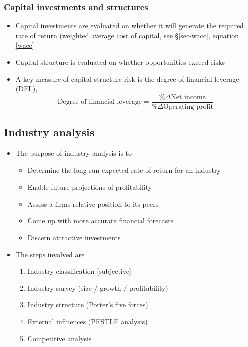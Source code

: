 \documentclass[../notes_compiled.tex]{subfiles}
\begin{document}
\subsubsection{Capital investments and structures}
\begin{itemize}
\item Capital investments are evaluated on whether it will generate the required rate of return (weighted average cost of capital, see \S\ref{sec-wacc}, equation \ref{wacc}
\item Capital structure is evaluated on whether opportunities exceed risks
\item A key measure of capital structure risk is the degree of financial leverage (DFL),
\begin{equation}
\text{Degree of financial leverage}  =\frac{\%\Delta\text{Net income}}{\%\Delta\text{Operating profit}}
\end{equation}
\end{itemize}

\subsection{Industry analysis}
\begin{itemize}
\item The purpose of industry analysis is to
\begin{itemize}
\item Determine the long-run expected rate of return for an industry
\item Enable future projections of profitability
\item Assess a firms relative position to its peers
\item Come up with more accurate financial forecasts
\item Discern attractive investments
\end{itemize}
\item The steps involved are
\begin{enumerate}
\item Industry classification [subjective]
\item Industry survey (size / growth / profitability)
\item Industry structure (Porter’s five forces)
\item External influences (PESTLE analysis)
\item Competitive analysis
\end{enumerate}
\end{itemize}
\end{document}
